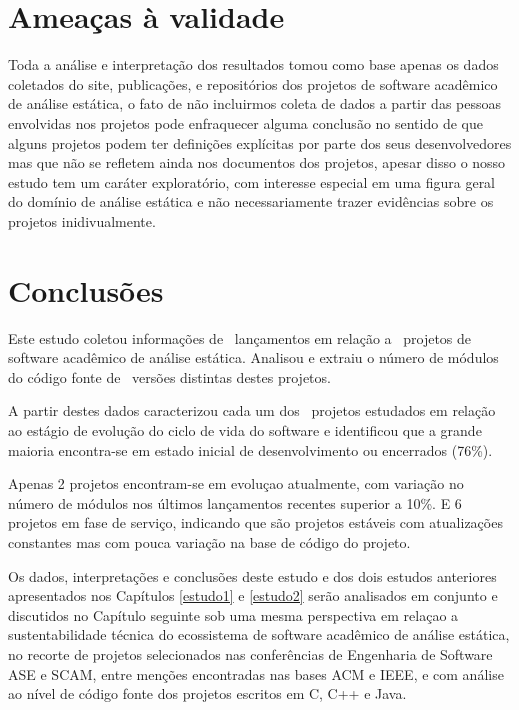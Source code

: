 
\section{Ameaças à validade} %

Toda a análise e interpretação dos resultados tomou como base apenas os dados
coletados do site, publicações, e repositórios dos projetos de software
acadêmico de análise estática, o fato de não incluirmos coleta de dados a
partir das pessoas envolvidas nos projetos pode enfraquecer alguma conclusão no
sentido de que alguns projetos podem ter definições explícitas por parte dos
seus desenvolvedores mas que não se refletem ainda nos documentos dos projetos,
apesar disso o nosso estudo tem um caráter exploratório, com interesse especial em
uma figura geral do domínio de análise estática e não necessariamente trazer
evidências sobre os projetos inidivualmente.


\section{Conclusões} \label{estudo3:conclusoes} %

Este estudo coletou informações de \ReleasesCount \ lançamentos em relação a
\ProjectsWithReleasesCount \ projetos de software acadêmico de análise
estática. Analisou e extraiu o número de módulos do código fonte de
\ReleasesMetricsCount \ versões distintas destes projetos.

A partir destes dados caracterizou cada um dos \SoftwareCount \ projetos
estudados em relação ao estágio de evolução do ciclo de vida do software e
identificou que a grande maioria encontra-se em estado inicial de
desenvolvimento ou encerrados (76\%).

Apenas 2 projetos encontram-se em evoluçao atualmente, com variação no número
de módulos nos últimos lançamentos recentes superior a 10\%. E 6 projetos em
fase de serviço, indicando que são projetos estáveis com atualizações
constantes mas com pouca variação na base de código do projeto.

Os dados, interpretações e conclusões deste estudo e dos dois estudos
anteriores apresentados nos Capítulos \ref{estudo1} e \ref{estudo2} serão
analisados em conjunto e discutidos no Capítulo seguinte sob uma mesma
perspectiva em relaçao a sustentabilidade técnica do ecossistema de software
acadêmico de análise estática, no recorte de projetos selecionados nas
conferências de Engenharia de Software ASE e SCAM, entre menções encontradas
nas bases ACM e IEEE, e com análise ao nível de código fonte dos projetos
escritos em C, C++ e Java.

